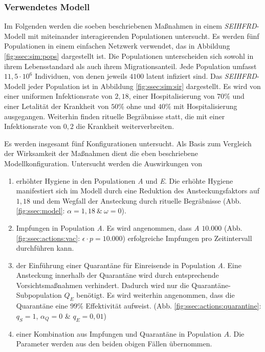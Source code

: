 \subsubsection{Verwendetes Modell}
Im Folgenden werden die soeben beschriebenen Maßnahmen in einem \emph{SEIHFRD}-Modell mit miteinander interagierenden Populationen untersucht. Es werden fünf Populationen in einem einfachen Netzwerk verwendet, das in Abbildung \ref{fig:ssec:sim:pops} dargestellt ist. Die Populationen unterscheiden sich sowohl in ihrem Lebensstandard als auch ihrem Migrationsanteil. Jede Population umfasst $11,5\cdot 10^6$ Individuen, von denen jeweils $4100$ latent infiziert sind. Das \emph{SEIHFRD}-Modell jeder Population ist in Abbildung \ref{fig:ssec:sim:sir} dargestellt. Es wird von einer uniformen Infektionsrate von $2,18$, einer Hospitalisierung von $70\%$ und einer Letalität der Krankheit von $50\%$ ohne und $40\%$ mit Hospitalisierung ausgegangen. Weiterhin finden rituelle Begräbnisse statt, die mit einer Infektionsrate von $0,2$ die Krankheit weiterverbreiten.

Es werden insgesamt fünf Konfigurationen untersucht. Als Basis zum Vergleich der Wirksamkeit der Maßnahmen dient die eben beschriebene Modellkonfiguration. Untersucht werden die Auswirkungen von 
\begin{enumerate}
\item erhöhter Hygiene in den Populationen \emph{A} und \emph{E}. Die erhöhte Hygiene manifestiert sich im Modell durch eine Reduktion des Ansteckungsfaktors auf $1,18$ und dem Wegfall der Ansteckung durch rituelle Begräbnisse (Abb. \ref{fig:ssec:model}: $\alpha = 1,18~\&~\omega = 0$).
\item Impfungen in Population \emph{A}. Es wird angenommen, dass \emph{A} $10.000$ (Abb. \ref{fig:ssec:actions:vac}: $\epsilon\cdot p = 10.000$) erfolgreiche Impfungen pro Zeitintervall durchführen kann. 
\item der Einführung einer Quarantäne für Einreisende in Population \emph{A}. Eine Ansteckung innerhalb der Quarantäne wird durch entsprechende Vorsichtsmaßnahmen verhindert. Dadurch wird nur die Quarantäne-Subpopulation $Q_E$ benötigt. Es wird weiterhin angenommen, dass die Quarantäne eine $99\%$ Effektivität aufweist. (Abb. \ref{fig:ssec:actions:quarantine}: $q_S=1$, $\alpha_Q=0$ \& $q_E=0,01$)
\item einer Kombination aus Impfungen und Quarantäne in Population $A$. Die Parameter werden aus den beiden obigen Fällen übernommen.
\end{enumerate}

